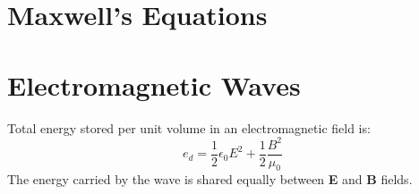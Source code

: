 \section{Maxwell's Equations}

\section{Electromagnetic Waves}
Total energy stored per unit volume in an electromagnetic field is:
\begin{equation*}
    e_{d} = \frac{1}{2}\epsilon_0 E^2 + \frac{1}{2}\frac{B^2}{\mu_0}
\end{equation*}
The energy carried by the wave is shared equally between \textbf{E} and \textbf{B} fields.